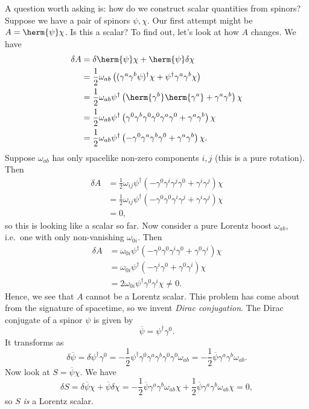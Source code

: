\documentclass{jknotes} %
\begin{document}
A question worth asking is: how do we construct scalar quantities from spinors? Suppose we have a pair of spinors \(\psi,\chi\). Our first attempt might be \(A=\herm{\psi}\chi\). Is this a scalar? To find out, let's look at how \(A\) changes. We have
\begin{align}
    \delta A &= \delta\herm{\psi}\chi + \herm{\psi}\delta\chi \\
             &= \frac{1}{2}\omega_{ab}\left( (\gamma^a\gamma^b\psi)^\dagger \chi + \psi^\dagger \gamma^a\gamma^b\chi \right) \\
             &= \frac{1}{2}\omega_{ab}\psi^\dagger \left( \herm{\gamma^b}\herm{\gamma^a} + \gamma^a\gamma^b \right) \chi \\
             &= \frac{1}{2}\omega_{ab}\psi^\dagger \left( \gamma^0 \gamma^b\gamma^0\gamma^0\gamma^a\gamma^0+ \gamma^a\gamma^b \right) \chi \\
             &= \frac{1}{2}\omega_{ab}\psi^\dagger \left( -\gamma^0 \gamma^a\gamma^b\gamma^0+ \gamma^a\gamma^b \right) \chi.
\end{align}
Suppose \(\omega_{ab}\) has only spacelike non-zero components \(i,j\) (this is a pure rotation). Then
\begin{align}
    \delta A &=\frac{1}{2}\omega_{ij}\psi^\dagger \left( -\gamma^0 \gamma^i\gamma^j\gamma^0+ \gamma^i\gamma^j \right) \chi \\
             &=\frac{1}{2}\omega_{ij}\psi^\dagger \left( -\gamma^0 \gamma^0\gamma^i\gamma^j+ \gamma^i\gamma^j \right) \chi \\
             &=0,
\end{align}
so this is looking like a scalar so far. Now consider a pure Lorentz boost \(\omega_{ab}\), i.e.\ one with only non-vanishing \(\omega_{0i}\). Then
\begin{align}
    \delta A &=\omega_{0i}\psi^\dagger \left( -\gamma^0 \gamma^0\gamma^i\gamma^0+ \gamma^0\gamma^i \right) \chi \\
             &=\omega_{0i}\psi^\dagger \left(-\gamma^i\gamma^0+\gamma^0\gamma^i\right)\chi \\
             &= 2\omega_{0i}\psi^\dagger\gamma^0\gamma^i\chi \ne 0.
\end{align}
Hence, we see that \(A\) cannot be a Lorentz scalar. This problem has come about from the signature of spacetime, so we invent \emph{Dirac conjugation}. The Dirac conjugate of a spinor \(\psi\) is given by
\begin{equation}
    \overline{\psi}=\psi^\dagger\gamma^0.
\end{equation}
It transforms as
\begin{equation}
    \delta\overline{\psi} = \delta\psi^\dagger\gamma^0 = -\frac{1}{2}\psi^\dagger\gamma^0\gamma^a\gamma^b\gamma^0\gamma^0\omega_{ab} = -\frac{1}{2}\overline{\psi}\gamma^a\gamma^b\omega_{ab}.
\end{equation}
Now look at \(S=\overline{\psi}\chi\). We have
\begin{equation}
    \delta S = \delta\overline{\psi}\chi+\overline{\psi}\delta\chi = -\frac{1}{2}\overline{\psi}\gamma^a\gamma^b\omega_{ab}\chi + \frac{1}{2}\overline{\psi}\gamma^a\gamma^b\omega_{ab}\chi = 0,
\end{equation}
so \(S\) \emph{is} a Lorentz scalar.
\end{document}
